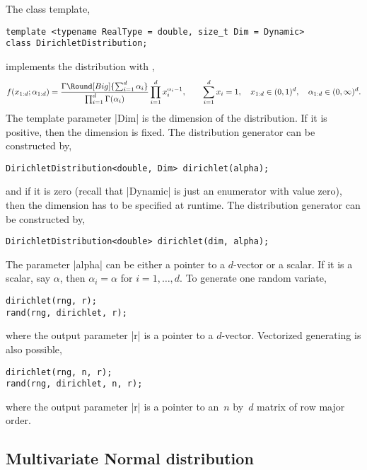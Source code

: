 The class template,
\begin{verbatim}
template <typename RealType = double, size_t Dim = Dynamic>
class DirichletDistribution;
\end{verbatim}
implements the distribution with \pdf,
\begin{equation*}
  f(x_{1:d};\alpha_{1:d}) =
  \frac{\Gamma\Round[Big]{\sum_{i=1}^d\alpha_i}}{\prod_{i=1}^d\Gamma(\alpha_i)}
  \prod_{i=1}^d x_i^{\alpha_i - 1},\qquad
  \sum_{i=1}^d x_i = 1,\quad
  x_{1:d}\in(0,1)^d,\quad
  \alpha_{1:d}\in(0,\infty)^d.
\end{equation*}
The template parameter |Dim| is the dimension of the distribution. If it is
positive, then the dimension is fixed. The distribution generator can be
constructed by,
\begin{verbatim}
DirichletDistribution<double, Dim> dirichlet(alpha);
\end{verbatim}
and if it is zero (recall that |Dynamic| is just an enumerator with value
zero), then the dimension has to be specified at runtime. The distribution
generator can be constructed by,
\begin{verbatim}
DirichletDistribution<double> dirichlet(dim, alpha);
\end{verbatim}
The parameter |alpha| can be either a pointer to a $d$-vector or a scalar. If
it is a scalar, say $\alpha$, then $\alpha_i = \alpha$ for $i = 1,\dots,d$. To
generate one random variate,
\begin{verbatim}
dirichlet(rng, r);
rand(rng, dirichlet, r);
\end{verbatim}
where the output parameter |r| is a pointer to a $d$-vector. Vectorized
generating is also possible,
\begin{verbatim}
dirichlet(rng, n, r);
rand(rng, dirichlet, n, r);
\end{verbatim}
where the output parameter |r| is a pointer to an~$n$ by~$d$ matrix of row
major order.

\subsection{Multivariate Normal distribution}
\label{sub:Multivariate Normal distribution}

